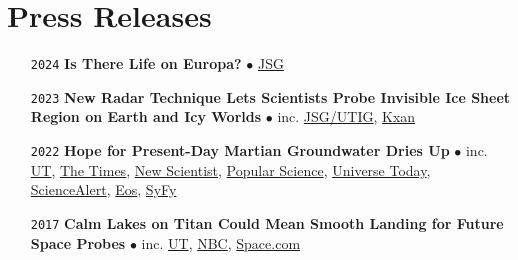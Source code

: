 \section*{Press Releases}

\begin{itemize}[leftmargin=3.8em, labelsep=1.5em]
    \setlength\itemsep{-.5em}

    \item[\texttt{2024}] \textbf{Is There Life on Europa?} $\bullet$ \href{https://www.jsg.utexas.edu/news/2023/12/is-there-life-on-europa/}{JSG}
    
    \item[\texttt{2023}] \textbf{New Radar Technique Lets Scientists Probe Invisible Ice Sheet Region on Earth and Icy Worlds} $\bullet$ inc. \href{https://ig.utexas.edu/news/2023/new-radar-technique-lets-scientists-probe-invisible-ice-sheet-region-on-earth-and-icy-worlds/}{JSG/UTIG}, \href{https://www.kxan.com/news/science/texas-students-work-travels-to-jupiter-helps-track-climate-change-on-earth/}{Kxan}
    
    \item[\texttt{2022}] \textbf{Hope for Present-Day Martian Groundwater Dries Up} $\bullet$ inc. \href{https://news.utexas.edu/2022/01/24/hope-for-present-day-martian-groundwater-dries-up/}{UT}, \href{https://www.thetimes.co.uk/article/hope-dries-up-of-water-on-mars-qngbmwdgp}{The Times}, \href{https://www.newscientist.com/article/2305601-mars-lake-may-actually-be-volcanic-rocks-buried-beneath-the-ice-cap/}{New Scientist}, \href{https://www.popsci.com/science/liquid-water-on-mars-debate/}{Popular Science}, \href{https://www.universetoday.com/154242/is-the-underground-lake-on-mars-just-volcanic-rock/#more-154242}{Universe Today}, \href{https://www.sciencealert.com/liquid-water-detected-under-mars-polar-ice-cap-was-probably-just-rock-new-study-reveals}{ScienceAlert}, \href{https://eos.org/articles/the-bumpy-search-for-liquid-water-at-the-south-pole-of-mars}{Eos}, \href{https://www.syfy.com/syfy-wire/bad-astronomy-liquid-water-under-martian-ice-cap-debate}{SyFy}
    
    \item[\texttt{2017}] \textbf{Calm Lakes on Titan Could Mean Smooth Landing for Future Space Probes} $\bullet$ inc. \href{https://news.utexas.edu/2017/07/06/calm-lakes-on-titan/}{UT}, \href{https://www.nbcnews.com/mach/science/you-can-forget-about-surfing-saturn-s-moon-titan-here-ncna780711}{NBC}, \href{https://www.space.com/37417-saturn-moon-titan-calm-seas-cassini.html}{Space.com}
    

\end{itemize}
